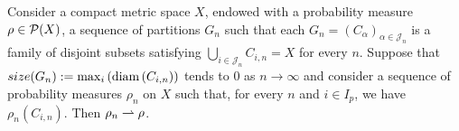 \begin{theorem}
	Consider a compact metric space $X$, endowed with a probability measure $\rho \in \mathcal{P}(X)$, a sequence of partitions $G_n$ such that each $G_n=(C_\alpha)_{\alpha \in \mathcal{J}_n}$ is a family of disjoint subsets satisfying $\bigcup_{i\in \mathcal{J}_n}C_{i,n}=X$ for every $n$. Suppose that $size(G_n):=\max_i \left( \mathrm{diam}\left( C_{i,n} \right) \right)$ tends to $0$ as $n\rightarrow \infty$ and consider a sequence of probability measures $\rho_n$ on $X$ such that, for every $n$ and $i\in I_p$, we have $\rho_n(C_{i,n})$. Then $\rho_n\rightharpoonup\rho$.
\end{theorem}